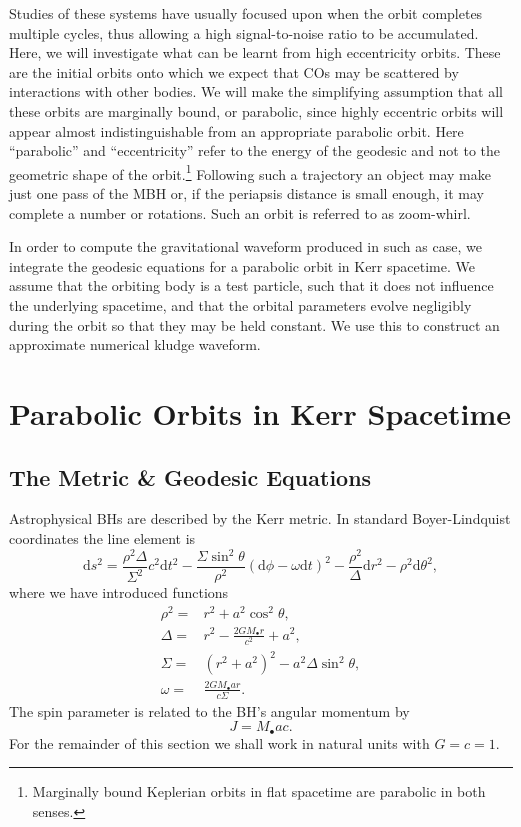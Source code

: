 \documentclass[a4paper, 11pt, titlepage, twoside]{report}
\newcommand{\dd}{\ensuremath{\mathrm{d}}}
\begin{document}
Studies of these systems have usually focused upon when the orbit completes multiple cycles, thus allowing a high signal-to-noise ratio to be accumulated. Here, we will investigate what can be learnt from high eccentricity orbits. These are the initial orbits onto which we expect that COs may be scattered by interactions with other bodies. We will make the simplifying assumption that all these orbits are marginally bound, or parabolic, since highly eccentric orbits will appear almost indistinguishable from an appropriate parabolic orbit\cite{Kobayashi2004}. Here ``parabolic'' and ``eccentricity'' refer to the energy of the geodesic and not to the geometric shape of the orbit.\footnote{Marginally bound Keplerian orbits in flat spacetime are parabolic in both senses.} Following such a trajectory an object may make just one pass of the MBH or, if the periapsis distance is small enough, it may complete a number or rotations. Such an orbit is referred to as zoom-whirl.

In order to compute the gravitational waveform produced in such as case, we integrate the geodesic equations for a parabolic orbit in Kerr spacetime. We assume that the orbiting body is a test particle, such that it does not influence the underlying spacetime, and that the orbital parameters evolve negligibly during the orbit so that they may be held constant. We use this to construct an approximate numerical kludge waveform\cite{Babak2007}.

\section{Parabolic Orbits in Kerr Spacetime}

\subsection{The Metric \& Geodesic Equations}

Astrophysical BHs are described by the Kerr metric\cite{Kerr1963}. In standard Boyer-Lindquist coordinates the line element is\cite{Boyer1967, Hobson2006}
\begin{equation}
\dd s^2 = \frac{\rho^2 \Delta}{\Sigma^2}c^2\dd t^2 - \frac{\Sigma \sin^2 \theta}{\rho^2}\left(\dd \phi - \omega \dd t\right)^2 - \frac{\rho^2}{\Delta}\dd r^2 - \rho^2\dd \theta^2,
\end{equation}
where we have introduced functions
\begin{align}
\rho^2 = {} & r^2 + a^2\cos^2\theta,\\
\Delta = {} & r^2 - \frac{2GM_\bullet r}{c^2} + a^2,\\
\Sigma = {} & \left(r^2 +a^2\right)^2 - a^2\Delta\sin^2\theta,\\
\omega = {} & \frac{2GM_\bullet ar}{c\Sigma}.
\end{align}
The spin parameter is related to the BH's angular momentum by
\begin{equation}
J = M_\bullet ac.
\end{equation}
For the remainder of this section we shall work in natural units with $G = c = 1$.
\end{document}
